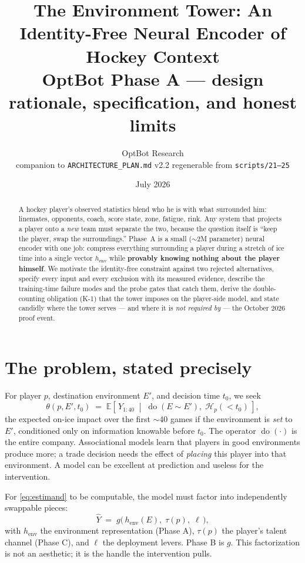 \documentclass[11pt]{article}
\title{\color{navy}\textbf{The Environment Tower: An Identity-Free Neural
Encoder of Hockey Context}\\[4pt]
\large OptBot Phase A --- design rationale, specification, and honest limits}
\author{OptBot Research \\ \small companion to \texttt{ARCHITECTURE\_PLAN.md} v2.2 \; \textperiodcentered\; regenerable from \texttt{scripts/21--25}}
\date{July 2026}
\newcommand{\henv}{\ensuremath{h_{\mathrm{env}}}}
\newcommand{\dodo}[1]{\ensuremath{\operatorname{do}(#1)}}
\begin{document}
\maketitle

\begin{abstract}
\noindent A hockey player's observed statistics blend who he is with what
surrounded him: linemates, opponents, coach, score state, zone, fatigue, rink.
Any system that projects a player onto a \emph{new} team must separate the two,
because the question itself is ``keep the player, swap the surroundings.''
Phase~A is a small ($\sim$2M parameter) neural encoder with one job: compress
everything surrounding a player during a stretch of ice time into a single
vector \henv{} while \textbf{provably knowing nothing about the player himself}.
We motivate the identity-free constraint against two rejected alternatives,
specify every input and every exclusion with its measured evidence, describe the
training-time failure modes and the probe gates that catch them, derive the
double-counting obligation (K-1) that the tower imposes on the player-side
model, and state candidly where the tower serves --- and where it is
\emph{not required by} --- the October 2026 proof event.
\end{abstract}

\section{The problem, stated precisely}
For player $p$, destination environment $E'$, and decision time $t_0$, we seek
\begin{equation}
\theta(p, E', t_0) \;=\; \mathbb{E}\!\left[\, Y_{1:40} \;\middle|\;
\dodo{E \sim E'},\; \mathcal{H}_p(<\!t_0) \,\right],
\label{eq:estimand}
\end{equation}
the expected on-ice impact over the first $\sim$40 games if the environment is
\emph{set} to $E'$, conditioned only on information knowable before $t_0$.
The operator $\dodo{\cdot}$ is the entire company. Associational models learn
that players in good environments produce more; a trade decision needs the
effect of \emph{placing} this player into that environment. A model can be
excellent at prediction and useless for the intervention.

For \eqref{eq:estimand} to be computable, the model must factor into
independently swappable pieces:
\begin{equation}
\widehat{Y} \;=\; g\big(\, \henv(E),\; \tau(p),\; \ell \,\big),
\label{eq:factorization}
\end{equation}
with \henv{} the environment representation (Phase A), $\tau(p)$ the player's
talent channel (Phase C), and $\ell$ the deployment levers. Phase B is $g$.
This factorization is not an aesthetic; it is the handle the intervention pulls.
\end{document}
